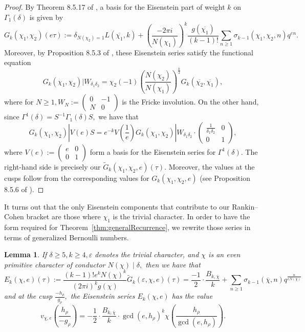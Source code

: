 \documentclass[10pt]{amsart}
\newtheorem{lemma}[theorem]{Lemma}
\theoremstyle{definition}
\theoremstyle{remark}
\numberwithin{equation}{section}
\begin{document}
	\begin{proof}
		By Theorem 8.5.17 of \cite{Stromberg}, a basis for the Eisenstein part of weight $k$ on $\Gamma_1(\delta)$ is given by
		$$
		G_k(\chi_1,\chi_2)(e\tau):=\delta_{N(\chi_2)=1}L(\overline{\chi_1},k)+\left(\frac{-2\pi i}{N(\chi_1)}\right)^k\frac{g(\overline{\chi_1})}{(k-1)!}\sum\limits_{n\geq 1}\sigma_{k-1}(\chi_1,\chi_2,n)q^{en}.
		$$		
		Moreover, by Proposition 8.5.3 of \cite{Stromberg}, these Eisenstein series satisfy the functional equation
		$$
		G_k(\chi_1,\chi_2)|W_{\delta_1\delta_2}=\chi_2(-1)\left(\frac{N(\chi_2)}{N(\chi_1)}\right)^{\frac{k}{2}}G_k(\overline{\chi_2},\overline{\chi_1}),
		$$
		where for $N\geq 1, W_N:=\begin{pmatrix}
			0 & -1 \\ 
			N & 0
		\end{pmatrix}$ is the Fricke involution.
		On the other hand, since $\Gamma^1(\delta)=S^{-1}\Gamma_1(\delta)S,$ we have that
		$$
		G_k(\chi_1,\chi_2)|V(e)S = e^{-k} V\left(\frac{1}{e}\right)G_k(\chi_1,\chi_2)|W_{\delta_1\delta_2}\cdot\begin{pmatrix}
			\frac{1}{\delta_1\delta_2} & 0 \\
			0 & 1
		\end{pmatrix},
		$$
		where $V(e):=\begin{pmatrix}
			e & 0 \\
			0 & 1
		\end{pmatrix}$
		form a basis for the Eisenstein series for $\Gamma^1(\delta).$ The right-hand side is precisely our $\tilde{G}_k(\chi_1,\chi_2,e)(\tau).$ Moreover, the values at the cusps follow from the corresponding values for $G_k(\chi_1,\chi_2,e)$ (see Proposition 8.5.6 of \cite{Stromberg}).
	\end{proof}
	
	It turns out that the only Eisenstein components that contribute to our Rankin--Cohen bracket are those where $\chi_1$ is the trivial character. In order to have the form required for Theorem~\ref{thm:generalRecurrence}, we rewrite those series in terms of generalized Bernoulli numbers.
	
	\begin{lemma}\label{lem:EisenSimplify}
		If $\delta\geq 5,k\geq 4, \varepsilon$ denotes the trivial character, and $\chi$ is an even primitive character of conductor $N(\chi)\mid\delta,$ then we have that
		$$
		E_k(\chi,e)(\tau):=\frac{(k-1)!e^kN(\chi)^k}{(2\pi i)^kg(\chi)}\tilde{G}_k(\varepsilon,\chi,e)(\tau)=\frac{-1}{2}\cdot\frac{B_{k,\overline{\chi}}}{k}+\sum\limits_{n\geq 1}\sigma_{k-1}(\overline{\chi},n)q^{\frac{n}{eN(\chi)}}
		$$
		and at the cusp $\frac{-h_\rho}{g_\rho},$ the Eisenstein series $E_k(\chi,e)$ has the value
		$$
		v_{\chi,e}\left(\frac{h_\rho}{-g_\rho}\right) = -\frac{1}{2}\cdot\frac{B_{k,\overline{\chi}}}{k}\cdot  \gcd(e,h_\rho)^k\chi\left(\frac{h_\rho}{\gcd(e,h_\rho)}\right).
		$$
	\end{lemma}
	
\end{document}
